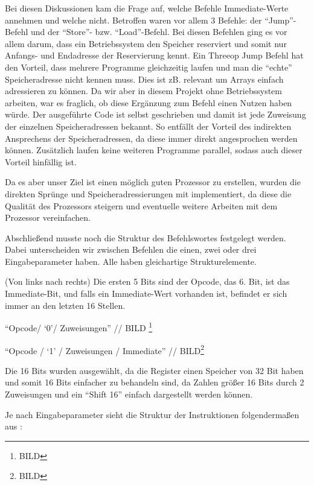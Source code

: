\documentclass[paper=a4,fontsize=12pt,twocolumn]{scrreprt}
\begin{document}
Bei diesen Diskussionen kam die Frage auf, welche Befehle Immediate-Werte annehmen und welche nicht.
Betroffen waren vor allem 3 Befehle: der \enquote{Jump}-Befehl und der \enquote{Store}- bzw. \enquote{Load}-Befehl.
Bei diesen Befehlen ging es vor allem darum, dass ein Betriebssystem den Speicher reserviert und somit nur Anfangs- und Endadresse der Reservierung kennt.
Ein Threeop Jump Befehl hat den Vorteil, dass mehrere Programme gleichzeitig laufen und man die \enquote{echte} Speicheradresse nicht kennen muss.
Dies ist zB. relevant um Arrays einfach adressieren zu können.
Da wir aber in diesem Projekt ohne Betriebssystem arbeiten, war es fraglich, ob diese Ergänzung zum Befehl einen Nutzen haben würde.
Der ausgeführte Code ist selbst geschrieben und damit ist jede Zuweisung der einzelnen Speicheradressen bekannt.
So entfällt der Vorteil des indirekten Ansprechens der Speicheradressen, da diese immer direkt angesprochen werden können.
Zusätzlich laufen keine weiteren Programme parallel, sodass auch dieser Vorteil hinfällig ist.

Da es aber unser Ziel ist einen möglich guten Prozessor zu erstellen, wurden die direkten Sprünge und Speicheradressierungen mit implementiert, da diese die Qualität des Prozessors steigern und eventuelle weitere Arbeiten mit dem Prozessor vereinfachen.

Abschließend musste noch die Struktur des Befehlswortes festgelegt werden. Dabei unterscheiden wir zwischen Befehlen die einen, zwei oder drei Eingabeparameter haben.
Alle haben gleichartige Strukturelemente.

(Von links nach rechts) Die ersten 5 Bits sind der Opcode, das 6. Bit, ist das Immediate-Bit, und falls ein Immediate-Wert vorhanden ist, befindet er sich immer an den letzten 16 Stellen.

\enquote{Opcode/ \enquote{0}/ Zuweisungen}  // BILD \footnote{BILD}

\enquote{Opcode / \enquote{1} / Zuweisungen / Immediate} // BILD\footnote{BILD}

Die 16 Bits wurden ausgewählt, da die Register einen Speicher von 32 Bit haben und somit 16 Bits einfacher zu behandeln sind, da Zahlen größer 16 Bits durch 2 Zuweisungen und ein \enquote{Shift 16} einfach dargestellt werden können.

Je nach Eingabeparameter sieht die Struktur der Instruktionen folgendermaßen aus :
\end{document}
